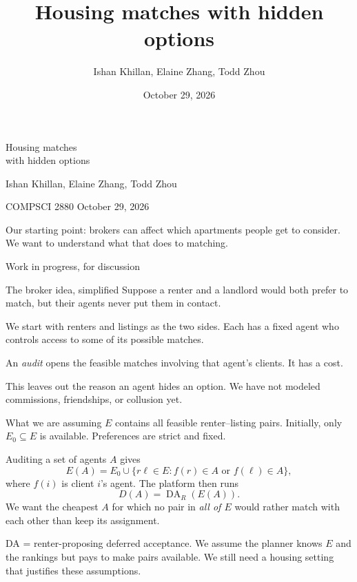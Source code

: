 \documentclass[aspectratio=169,14pt]{beamer}
\title{Housing matches with hidden options}
\author{Ishan Khillan, Elaine Zhang, Todd Zhou}
\date{October 29, 2026}
\newcommand{\DA}{\operatorname{DA}}
\newcommand{\sources}[1]{\vfill{\fontsize{9}{11}\selectfont\color{muted}#1\par}}
\begin{document}
\begin{frame}[plain]
\vspace{7mm}
{\fontsize{25}{29}\selectfont Housing matches\\with hidden options\par}
\vspace{8mm}
Ishan Khillan, Elaine Zhang, Todd Zhou\par
{\small COMPSCI 2880 \quad October 29, 2026\par}
\vspace{8mm}
\small
Our starting point: brokers can affect which apartments people get to consider.
We want to understand what that does to matching.
\vfill
{\color{muted}Work in progress, for discussion\par}
\end{frame}

\begin{frame}[t]{The broker idea, simplified}
\small
Suppose a renter and a landlord would both prefer to match, but their
agents never put them in contact.

\medskip
We start with renters and listings as the two sides. Each has a fixed
agent who controls access to some of its possible matches.

\medskip
An \emph{audit} opens the feasible matches involving that agent's clients.
It has a cost.

\medskip
This leaves out the reason an agent hides an option.
We have not modeled commissions, friendships, or collusion yet.
\end{frame}

\begin{frame}[t]{What we are assuming}
\small
$E$ contains all feasible renter--listing pairs. Initially, only
$E_0\subseteq E$ is available. Preferences are strict and fixed.

Auditing a set of agents $A$ gives
\[
 E(A)=E_0\cup\{r\ell\in E:f(r)\in A\text{ or }f(\ell)\in A\},
\]
where $f(i)$ is client $i$'s agent. The platform then runs
\[
 D(A)=\DA_R(E(A)).
\]
We want the cheapest $A$ for which no pair in \emph{all of $E$}
would rather match with each other than keep its assignment.

\sources{DA = renter-proposing deferred acceptance. We assume the planner knows
$E$ and the rankings but pays to make pairs available. We still need a housing
setting that justifies these assumptions.}
\end{frame}
\end{document}
